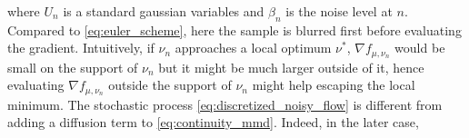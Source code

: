 where $U_n$ is a standard gaussian variables and $\beta_n$ is the noise level at $n$. Compared to \cref{eq:euler_scheme}, here the sample is blurred first before evaluating the gradient.
Intuitively, if $\nu_n$ approaches a local optimum $\nu^{*}$, $ \nabla f_{\mu,\nu_n}$ would be small on the support of $\nu_n$ but it might be much larger outside of it, hence evaluating $\nabla f_{\mu,\nu_n}$ outside the support of $\nu_n$ might help escaping the local minimum. The stochastic process \cref{eq:discretized_noisy_flow} is different from adding a diffusion term to \cref{eq:continuity_mmd}. Indeed, in the later case, %

